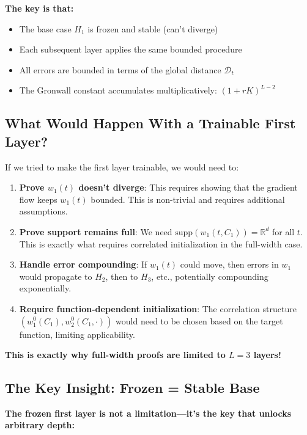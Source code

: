 \textbf{The key is that:}
\begin{itemize}
\item The base case $H_1$ is frozen and stable (can't diverge)
\item Each subsequent layer applies the same bounded procedure
\item All errors are bounded in terms of the global distance $\mathscr{D}_t$
\item The Gronwall constant accumulates multiplicatively: $(1+rK)^{L-2}$
\end{itemize}

\subsection{What Would Happen With a Trainable First Layer?}

If we tried to make the first layer trainable, we would need to:

\begin{enumerate}
\item \textbf{Prove $w_1(t)$ doesn't diverge}: This requires showing that the gradient flow keeps $w_1(t)$ bounded. This is non-trivial and requires additional assumptions.

\item \textbf{Prove support remains full}: We need $\text{supp}(w_1(t, C_1)) = \mathbb{R}^d$ for all $t$. This is exactly what requires correlated initialization in the full-width case.

\item \textbf{Handle error compounding}: If $w_1(t)$ could move, then errors in $w_1$ would propagate to $H_2$, then to $H_3$, etc., potentially compounding exponentially.

\item \textbf{Require function-dependent initialization}: The correlation structure $(w_1^0(C_1), w_2^0(C_1, \cdot))$ would need to be chosen based on the target function, limiting applicability.
\end{enumerate}

\textbf{This is exactly why full-width proofs are limited to $L=3$ layers!}

\subsection{The Key Insight: Frozen = Stable Base}

\textbf{The frozen first layer is not a limitation—it's the key that unlocks arbitrary depth:}

